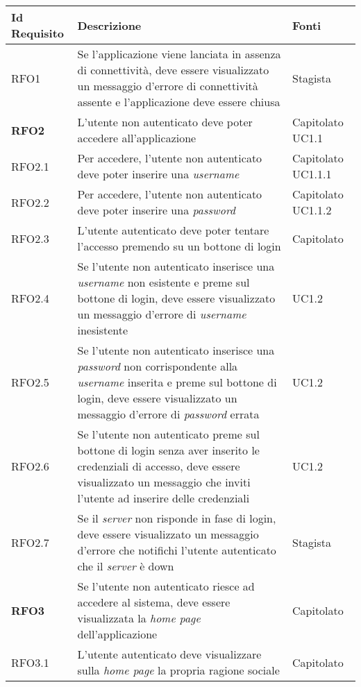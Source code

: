 {\renewcommand{\arraystretch}{2}
\begin{center}
\begin{longtable}{ | >{\centering\arraybackslash}p{2.5cm} | >{\arraybackslash}p{7cm} | >{\centering\arraybackslash}p{2cm} | }
        
\hline
\textbf{Id Requisito} & \textbf{Descrizione} & \textbf{Fonti} \\ \hline
\endhead
RFO1 & Se l'applicazione viene lanciata in assenza di connettività, deve essere visualizzato un messaggio d'errore di connettività assente e l'applicazione deve essere chiusa & Stagista \\ \hline
\textbf{RFO2} & L'utente non autenticato deve poter accedere all'applicazione & Capitolato UC1.1 \\ \hline
RFO2.1 & Per accedere, l'utente non autenticato deve poter inserire una \textit{username} & Capitolato UC1.1.1 \\ \hline
RFO2.2 & Per accedere, l'utente non autenticato deve poter inserire una \textit{password} & Capitolato UC1.1.2 \\ \hline
RFO2.3 & L'utente autenticato deve poter tentare l'accesso premendo su un bottone di login & Capitolato\\ \hline
RFO2.4 & Se l'utente non autenticato inserisce una \textit{username} non esistente e preme sul bottone di login, deve essere visualizzato un messaggio d'errore di \textit{username} inesistente & UC1.2 \\ \hline
RFO2.5 & Se l'utente non autenticato inserisce una \textit{password} non corrispondente alla \textit{username} inserita e preme sul bottone di login, deve essere visualizzato un messaggio d'errore di \textit{password} errata & UC1.2 \\ \hline
RFO2.6 & Se l'utente non autenticato preme sul bottone di login senza aver inserito le credenziali di accesso, deve essere visualizzato un messaggio che inviti l'utente ad inserire delle credenziali & UC1.2 \\ \hline
RFO2.7 & Se il \textit{server} non risponde in fase di login, deve essere visualizzato un messaggio d'errore che notifichi l'utente autenticato che il \textit{server} è down & Stagista \\ \hline
\textbf{RFO3} & Se l'utente non autenticato riesce ad accedere al sistema, deve essere visualizzata la \textit{home page} dell'applicazione & Capitolato \\ \hline
RFO3.1 & L'utente autenticato deve visualizzare sulla \textit{home page} la propria ragione sociale & Capitolato \\ \hline

\end{longtable}
\end{center}}
